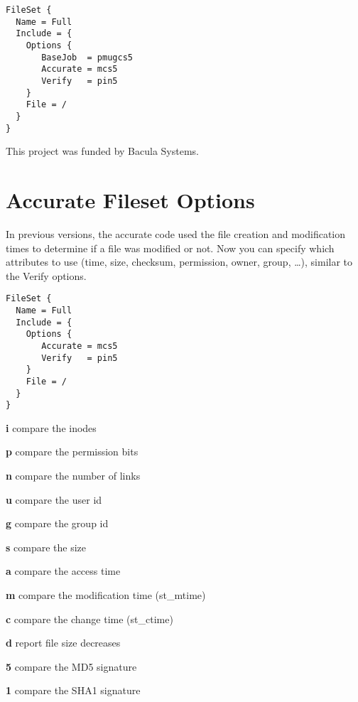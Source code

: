 \begin{verbatim}
FileSet {
  Name = Full
  Include = {
    Options {
       BaseJob  = pmugcs5
       Accurate = mcs5
       Verify   = pin5
    }
    File = /
  }
}
\end{verbatim}


This project was funded by Bacula Systems.


\section{Accurate Fileset Options}
\label{sec:accuratefileset}

In previous versions, the accurate code used the file creation and
modification times to determine if a file was modified or not. Now you can specify
which attributes to use (time, size, checksum, permission, owner, group,
\dots), similar to the Verify options.

\begin{verbatim}
FileSet {
  Name = Full
  Include = {
    Options {
       Accurate = mcs5
       Verify   = pin5
    }
    File = /
  }
}
\end{verbatim}

\begin{description}  
\item {\bf i}
  compare the inodes  
  
\item {\bf p}
  compare the permission bits  
  
\item {\bf n}
  compare the number of links  
  
\item {\bf u}
  compare the user id  
  
\item {\bf g}
  compare the group id  
  
\item {\bf s}
  compare the size  
  
\item {\bf a}
  compare the access time  
  
\item {\bf m}
  compare the modification time (st\_mtime)  
  
\item {\bf c}
  compare the change time (st\_ctime)  
  
\item {\bf d}
  report file size decreases  
  
\item {\bf 5}
  compare the MD5 signature  
  
\item {\bf 1}
  compare the SHA1 signature  
\end{description}

